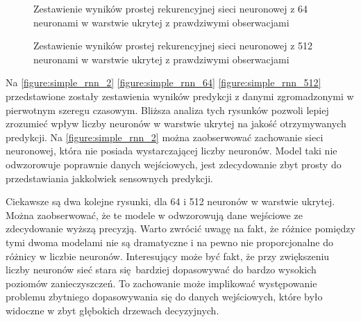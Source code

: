 \documentclass[10pt,a4paper]{article}
\begin{document}
\FloatBarrier
 \begin{figure}[!ht]
	\centering
	\caption{Zestawienie wyników prostej rekurencyjnej sieci neuronowej z 64 neuronami w warstwie ukrytej z prawdziwymi obserwacjami}
	\label{figure:simple_rnn_64}
\end{figure}
\FloatBarrier
 \begin{figure}[!ht]
	\centering
	\caption{Zestawienie wyników prostej rekurencyjnej sieci neuronowej z 512 neuronami w warstwie ukrytej z prawdziwymi obserwacjami}
	\label{figure:simple_rnn_512}
\end{figure}
\FloatBarrier

Na \autoref{figure:simple_rnn_2} \autoref{figure:simple_rnn_64} \autoref{figure:simple_rnn_512} przedstawione zostały zestawienia wyników predykcji z danymi zgromadzonymi w pierwotnym szeregu czasowym. Bliższa analiza tych rysunków pozwoli lepiej zrozumieć wpływ liczby neuronów w warstwie ukrytej na jakość otrzymywanych predykcji. Na \autoref{figure:simple_rnn_2} można zaobserwować zachowanie sieci neuronowej, która nie posiada wystarczającej liczby neuronów. Model taki nie odwzorowuje poprawnie danych wejściowych, jest zdecydowanie zbyt prosty do przedstawiania jakkolwiek sensownych predykcji. 

Ciekawsze są dwa kolejne rysunki, dla 64 i 512 neuronów w warstwie ukrytej. Można zaobserwować, że te modele w odwzorowują dane wejściowe ze zdecydowanie wyższą precyzją. Warto zwrócić uwagę na fakt, że różnice pomiędzy tymi dwoma modelami nie są dramatyczne i na pewno nie proporcjonalne do różnicy w liczbie neuronów. Interesujący może być fakt, że przy zwiększeniu liczby neuronów sieć stara się bardziej dopasowywać do bardzo wysokich poziomów zanieczyszczeń. To zachowanie może implikować występowanie problemu zbytniego dopasowywania się do danych wejściowych, które było widoczne w zbyt głębokich drzewach decyzyjnych.
\end{document}
